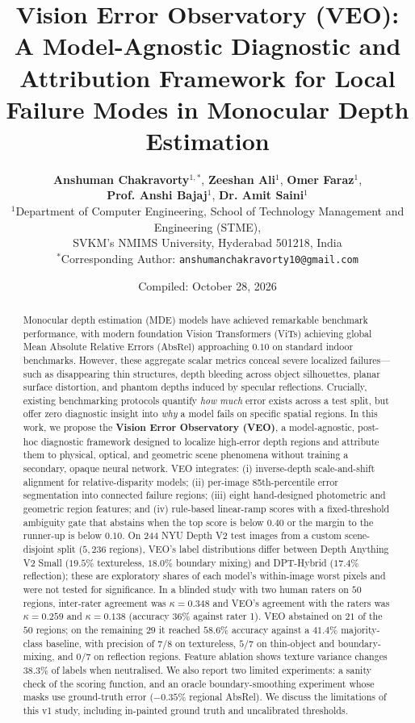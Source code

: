 \documentclass[11pt,a4paper]{article}
\title{\textbf{\Large Vision Error Observatory (VEO): A Model-Agnostic Diagnostic and Attribution Framework for Local Failure Modes in Monocular Depth Estimation}}
\author{
  \textbf{Anshuman Chakravorty}$^{1,*}$, \quad
  \textbf{Zeeshan Ali}$^{1}$, \quad
  \textbf{Omer Faraz}$^{1}$, \\
  \textbf{Prof. Anshi Bajaj}$^{1}$, \quad
  \textbf{Dr. Amit Saini}$^{1}$ \\[0.5em]
  \small $^{1}$Department of Computer Engineering, School of Technology Management and Engineering (STME), \\
  \small SVKM's NMIMS University, Hyderabad 501218, India \\[0.3em]
  \small $^{*}$Corresponding Author: \texttt{anshumanchakravorty10@gmail.com}
}
\date{\small Compiled: October 28, 2026}
\begin{document}
\maketitle

\begin{abstract}
Monocular depth estimation (MDE) models have achieved remarkable benchmark performance, with modern foundation Vision Transformers (ViTs) achieving global Mean Absolute Relative Errors ($\text{AbsRel}$) approaching $0.10$ on standard indoor benchmarks. However, these aggregate scalar metrics conceal severe localized failures—such as disappearing thin structures, depth bleeding across object silhouettes, planar surface distortion, and phantom depths induced by specular reflections. Crucially, existing benchmarking protocols quantify \textit{how much} error exists across a test split, but offer zero diagnostic insight into \textit{why} a model fails on specific spatial regions. In this work, we propose the \textbf{Vision Error Observatory (VEO)}, a model-agnostic, post-hoc diagnostic framework designed to localize high-error depth regions and attribute them to physical, optical, and geometric scene phenomena without training a secondary, opaque neural network. VEO integrates: (i) inverse-depth scale-and-shift alignment for relative-disparity models; (ii) per-image 85th-percentile error segmentation into connected failure regions; (iii) eight hand-designed photometric and geometric region features; and (iv) rule-based linear-ramp scores with a fixed-threshold ambiguity gate that abstains when the top score is below $0.40$ or the margin to the runner-up is below $0.10$. On 244 NYU Depth V2 test images from a custom scene-disjoint split ($5,236$ regions), VEO's label distributions differ between Depth Anything V2 Small ($19.5\%$ textureless, $18.0\%$ boundary mixing) and DPT-Hybrid ($17.4\%$ reflection); these are exploratory shares of each model's within-image worst pixels and were not tested for significance. In a blinded study with two human raters on $50$ regions, inter-rater agreement was $\kappa = 0.348$ and VEO's agreement with the raters was $\kappa = 0.259$ and $\kappa = 0.138$ (accuracy $36\%$ against rater 1). VEO abstained on $21$ of the $50$ regions; on the remaining $29$ it reached $58.6\%$ accuracy against a $41.4\%$ majority-class baseline, with precision of $7/8$ on textureless, $5/7$ on thin-object and boundary-mixing, and $0/7$ on reflection regions. Feature ablation shows texture variance changes $38.3\%$ of labels when neutralised. We also report two limited experiments: a sanity check of the scoring function, and an oracle boundary-smoothing experiment whose masks use ground-truth error ($-0.35\%$ regional AbsRel). We discuss the limitations of this v1 study, including in-painted ground truth and uncalibrated thresholds.
\end{abstract}
\end{document}
